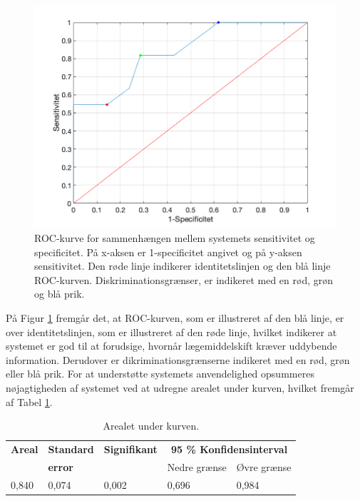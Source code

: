\begin{figure}[H]\centering
\includegraphics[width=1\textwidth]{billeder/ROC11.png} 
	\caption{ROC-kurve for sammenhængen mellem systemets sensitivitet og specificitet. På x-aksen er 1-specificitet angivet og på y-aksen sensitivitet. Den røde linje indikerer identitetslinjen og den blå linje ROC-kurven. Diskriminationsgrænser, er indikeret med en rød, grøn og blå prik.}
	\label{fig:ROC}  
\end{figure}

På Figur \ref{fig:ROC} fremgår det, at ROC-kurven, som er illustreret af den blå linje, er over identitetslinjen, som er illustreret af den røde linje, hvilket indikerer at systemet er god til at forudsige, hvornår lægemiddelskift kræver uddybende information. Derudover er dikriminationsgrænserne indikeret med en rød, grøn eller blå prik. For at understøtte systemets anvendelighed opsummeres nøjagtigheden af systemet ved at udregne arealet under kurven, hvilket fremgår af Tabel \ref{table:AUC}.

\begin{table}[H]
\caption{Arealet under kurven.}
\label{table:AUC}
\centering
\begin{tabular}{l|l|l|l|l}
 \rowcolor[HTML]{C0C0C0} \textbf{Areal}  &  \textbf{Standard}                       & \textbf{Signifikant} &
 \multicolumn{2}{c}{\textbf{95 \% Konfidensinterval}}  \\ 
  \rowcolor[HTML]{C0C0C0}                                                          & \textbf{error} &  & Nedre grænse      & Øvre grænse    \\ \hline
0,840 & 0,074 & 0,002 & 0,696 & 0,984 \\ \hline
\end{tabular}
\end{table}
\vspace{0.2cm}

